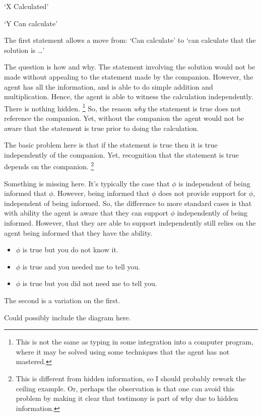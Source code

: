 \documentclass[10pt]{article}
\begin{document}
`X Calculated'

`Y Can calculate'

The first statement allows a move from: `Can calculate' to `can calculate that the solution is \dots'

The question is how and why.
The statement involving the solution would not be made without appealing to the statement made by the companion.
However, the agent has all the information, and is able to do simple addition and multiplication.
Hence, the agent is able to witness the calculation independently.
There is nothing hidden.\nolinebreak
\footnote{
  This is not the same as typing in some integration into a computer program, where it may be solved using some techniques that the agent has not mastered.
}
So, the reason \emph{why} the statement is true does not reference the companion.
Yet, without the companion the agent would not be aware that the statement is true prior to doing the calculation.

The basic problem here is that if the statement is true then it is true independently of the companion.
Yet, recognition that the statement is true depends on the companion.\nolinebreak
\footnote{
  This is different from hidden information, so I should probably rework the ceiling example.
  Or, perhaps the observation is that one can avoid this problem by making it clear that testimony is part of why due to hidden information.
}

{
  \color{red}
  Something is missing here.
  It's typically the case that \(\phi\) is independent of being informed that \(\phi\).
  However, being informed that \(\phi\) does not provide support for \(\phi\), independent of being informed.
  So, the difference to more standard cases is that with ability the agent is aware that they can support \(\phi\) independently of being informed.
  However, that they are able to support independently still relies on the agent being informed that they have the ability.

  \begin{itemize}
  \item \(\phi\) is true but you do not know it.
  \item \(\phi\) is true and you needed me to tell you.
  \item \(\phi\) is true but you did not need me to tell you.
  \end{itemize}
  The second is a variation on the first.
}

{
  \color{red}
  Could possibly include the diagram here.
}
\end{document}
